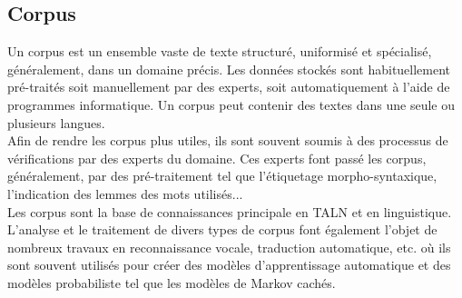     \subsection{Corpus}
    Un corpus est un ensemble vaste de texte structuré, uniformisé et spécialisé, généralement, dans un domaine précis.
    Les données stockés sont habituellement pré-traités soit manuellement par des experts, soit automatiquement à l'aide de programmes informatique. Un corpus peut contenir des textes dans une seule ou plusieurs langues.\\ 
    Afin de rendre les corpus plus utiles, ils sont souvent soumis à des processus de vérifications par des experts du domaine. Ces experts font passé les corpus, généralement, par des pré-traitement tel que l'étiquetage morpho-syntaxique, l'indication des lemmes des mots utilisés...\\
    Les corpus sont la base de connaissances principale en TALN et en linguistique. L'analyse et le traitement de divers types de corpus font également l'objet de nombreux travaux en reconnaissance vocale, traduction automatique, etc. où ils sont souvent utilisés pour créer des modèles d'apprentissage automatique et des modèles probabiliste tel que les modèles de Markov cachés.\\


